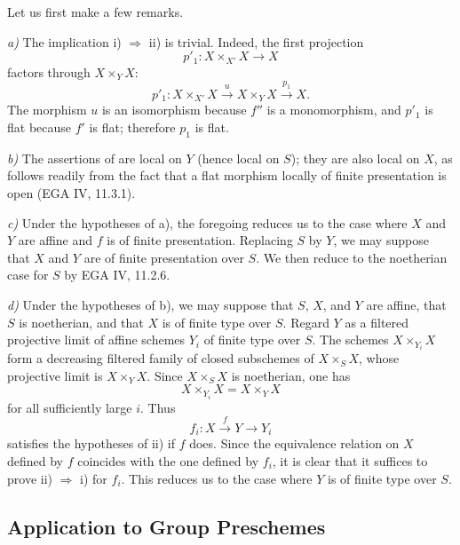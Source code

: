 Let us first make a few remarks.

\medskip
\noindent\textit{a)} The implication i) \(\Rightarrow\) ii) is
trivial. Indeed, the first projection
\[
  p'_1:X\times_{X'}X\longrightarrow X
\]
factors through \(X\times_Y X\):
\[
  p'_1:X\times_{X'}X\xrightarrow{\,u\,}
  X\times_Y X\xrightarrow{\,p_1\,}X.
\]
The morphism \(u\) is an isomorphism because \(f''\) is a
monomorphism, and \(p'_1\) is flat because \(f'\) is flat; therefore
\(p_1\) is flat.

\medskip
\noindent\textit{b)} The assertions of  are local on \(Y\)
(hence local on \(S\)); they are also local on \(X\), as follows
readily from the fact that a flat morphism locally of finite
presentation is open (EGA IV, 11.3.1).

\medskip
\noindent\textit{c)} Under the hypotheses of  a), the foregoing
reduces us to the case where \(X\) and \(Y\) are affine and \(f\) is
of finite presentation. Replacing \(S\) by \(Y\), we may suppose
that \(X\) and \(Y\) are of finite presentation over \(S\). We then
reduce to the noetherian case for \(S\) by EGA IV, 11.2.6.

\medskip
\noindent\textit{d)} Under the hypotheses of  b), we may suppose
that \(S\), \(X\), and \(Y\) are affine, that \(S\) is noetherian,
and that \(X\) is of finite type over \(S\). Regard \(Y\) as a
filtered projective limit of affine schemes \(Y_i\) of finite type
over \(S\). The schemes \(X\times_{Y_i}X\) form a decreasing
filtered family of closed subschemes of \(X\times_S X\), whose
projective limit is \(X\times_Y X\). Since \(X\times_S X\) is
noetherian, one has
\[
  X\times_{Y_i}X=X\times_Y X
\]
for all sufficiently large \(i\). Thus
\[
  f_i:X\xrightarrow{\,f\,}Y\longrightarrow Y_i
\]
satisfies the hypotheses of  ii) if \(f\) does. Since the
equivalence relation on \(X\) defined by \(f\) coincides with the
one defined by \(f_i\), it is clear that it suffices to prove
ii) \(\Rightarrow\) i) for \(f_i\). This reduces us to the case
where \(Y\) is of finite type over \(S\).

\subsection*{Application to Group Preschemes}

